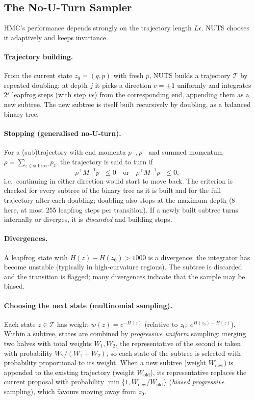 \documentclass[11pt]{article}
\theoremstyle{definition}
\theoremstyle{remark}
\begin{document}
\subsection{The No-U-Turn Sampler}
HMC's performance depends strongly on the trajectory length $L\epsilon$. NUTS chooses it adaptively and keeps invariance.

\paragraph{Trajectory building.} From the current state $z_0=(q,p)$ with fresh $p$, NUTS builds a trajectory $\mathcal T$ by repeated doubling: at depth $j$ it picks a direction $v=\pm1$ uniformly and integrates $2^j$ leapfrog steps (with step $v\epsilon$) from the corresponding end, appending them as a new subtree. The new subtree is itself built recursively by doubling, as a balanced binary tree.

\paragraph{Stopping (generalised no-U-turn).} For a (sub)trajectory with end momenta $p^-,p^+$ and summed momentum $\rho=\sum_{z\in\text{subtree}}p_z$, the trajectory is said to turn if
\[
\rho^\top M^{-1}p^-\le0\quad\text{or}\quad\rho^\top M^{-1}p^+\le0 ,
\]
i.e.\ continuing in either direction would start to move back. The criterion is checked for every subtree of the binary tree as it is built and for the full trajectory after each doubling; doubling also stops at the maximum depth (8 here, at most 255 leapfrog steps per transition). If a newly built subtree turns internally or diverges, it is \emph{discarded} and building stops.

\paragraph{Divergences.} A leapfrog state with $H(z)-H(z_0)>1000$ is a divergence: the integrator has become unstable (typically in high-curvature regions). The subtree is discarded and the transition is flagged; many divergences indicate that the sample may be biased.

\paragraph{Choosing the next state (multinomial sampling).} Each state $z\in\mathcal T$ has weight $w(z)=e^{-H(z)}$ (relative to $z_0$: $e^{H(z_0)-H(z)}$). Within a subtree, states are combined by \emph{progressive uniform} sampling: merging two halves with total weights $W_1,W_2$, the representative of the second is taken with probability $W_2/(W_1+W_2)$, so each state of the subtree is selected with probability proportional to its weight. When a new subtree (weight $W_{\mathrm{new}}$) is appended to the existing trajectory (weight $W_{\mathrm{old}}$), its representative replaces the current proposal with probability $\min\{1,W_{\mathrm{new}}/W_{\mathrm{old}}\}$ (\emph{biased progressive} sampling), which favours moving away from $z_0$.
\end{document}
